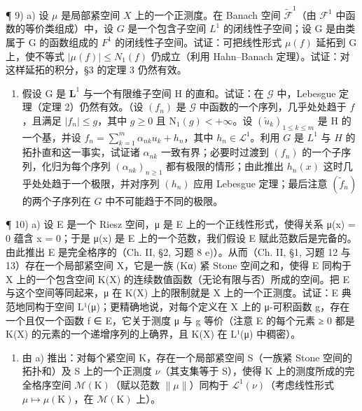 ¶ 9) a) 设 \(\mu\) 是局部紧空间 \(X\) 上的一个正测度。在 Banach 空间 \(\widetilde{\mathcal{F}}^1\)（由 \(\mathcal{F}^1\) 中函数的等价类组成）中，设 \(G\) 是一个包含子空间 \(L^{1}\) 的闭线性子空间；设 G 是由类属于 G 的函数组成的 \(F^{1}\) 的闭线性子空间。试证：可把线性形式 \(\mu(f)\) 延拓到 G 上，使不等式 \(|\mu(f)| \leqslant N_{1}(f)\) 仍成立（利用 Hahn--Banach 定理）。试证：对这样延拓的积分，§3 的定理 3 仍然有效。

\begin{enumerate}
\def\labelenumi{\alph{enumi})}
\setcounter{enumi}{1}
\tightlist
\item
  假设 G 是 \(\mathbf{L}^1\) 与一个有限维子空间 H 的直和。试证：在 \(\mathcal{G}\) 中，Lebesgue 定理（定理 2）仍然有效。（设 \((f_n)\) 是 \(\mathcal{G}\) 中函数的一个序列，几乎处处趋于 \(f\)，且满足 \(|f_n| \leqslant g\)，其中 \(g \geqslant 0\) 且 \(\mathrm{N}_1(g) < +\infty\)。设 \((\widetilde{u}_k)_{1 \leqslant k \leqslant m}\) 是 H 的一个基，并设 \(f_n = \sum_{k=1}^{m} \alpha_{nk} u_k + h_n\)，其中 \(h_n \in \mathcal{L}^1\)。利用 \(G\) 是 \(L^1\) 与 \(H\) 的拓扑直和这一事实，试证诸 \(\alpha_{nk}\) 一致有界；必要时过渡到 \((f_n)\) 的一个子序列，化归为每个序列 \((\alpha_{nk})_{n \geqslant 1}\) 都有极限的情形；由此推出 \(h_n(x)\) 这时几乎处处趋于一个极限，并对序列 \((h_n)\) 应用 Lebesgue 定理；最后注意 \((\widetilde{f}_n)\) 的两个子序列在 \(G\) 中不可能趋于不同的极限。
\end{enumerate}

¶ 10) a) 设 E 是一个 Riesz 空间，μ 是 E 上的一个正线性形式，使得关系 μ(\textbar x\textbar) = 0 蕴含 x = 0；于是 μ(\textbar x\textbar) 是 E 上的一个范数，我们假设 E 赋此范数后是完备的。由此推出 E 是完全格序的（Ch. II, §2, 习题 8 e)）。从而（Ch. II, §1, 习题 12 与 13）存在一个局部紧空间 X，它是一族 (Kα) 紧 Stone 空间之和，使得 E 同构于 X 上的一个包含空间 K(X) 的连续数值函数（无论有限与否）所成的空间。把 E 与这个空间等同起来，μ 在 K(X) 上的限制就是 X 上的一个正测度。试证：E 典范地同构于空间 L¹(μ)；更精确地说，对每个定义在 X 上的 μ-可积函数 g，存在一个且仅一个函数 f ∈ E，它关于测度 μ 与 g 等价（注意 E 的每个元素 ≥ 0 都是 K(X) 的元素的一个递增序列的上确界，且 K(X) 在 L¹(μ) 中稠密）。

\begin{enumerate}
\def\labelenumi{\alph{enumi})}
\setcounter{enumi}{1}
\tightlist
\item
  由 a) 推出：对每个紧空间 K，存在一个局部紧空间 S（一族紧 Stone 空间的拓扑和）及 S 上的一个正测度 \(\nu\)（其支集等于 S），使得 K 上的测度所成的完全格序空间 \(\mathcal{M}(\mathrm{K})\)（赋以范数 \(\|\mu\|\)）同构于 \(\mathcal{L}^{1}(\nu)\)（考虑线性形式 \(\mu\mapsto\mu(\mathrm{K})\)，在 \(\mathcal{M}(\mathrm{K})\) 上）。
\end{enumerate}


